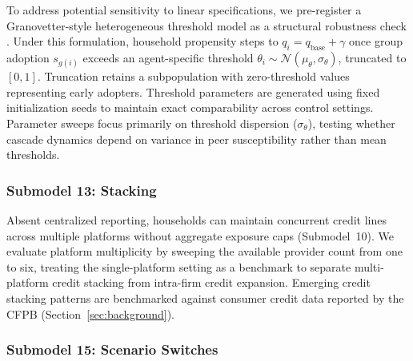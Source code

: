 To address potential sensitivity to linear specifications, we pre-register a Granovetter-style heterogeneous threshold model as a structural robustness check \cite{granovetter1978threshold}.
Under this formulation, household propensity steps to $q_i = q_{\text{base}} + \gamma$ once group adoption $s_{g(i)}$ exceeds an agent-specific threshold $\theta_i \sim \mathcal{N}(\mu_\theta, \sigma_\theta)$, truncated to $[0,1]$.
Truncation retains a subpopulation with zero-threshold values representing early adopters.
Threshold parameters are generated using fixed initialization seeds to maintain exact comparability across control settings.
Parameter sweeps focus primarily on threshold dispersion ($\sigma_\theta$), testing whether cascade dynamics depend on variance in peer susceptibility rather than mean thresholds.

\subsubsection*{Submodel 13: Stacking}
\label{sec:stacking}

Absent centralized reporting, households can maintain concurrent credit lines across multiple platforms without aggregate exposure caps (Submodel~10). We evaluate platform multiplicity by sweeping the available provider count from one to six, treating the single-platform setting as a benchmark to separate multi-platform credit stacking from intra-firm credit expansion. Emerging credit stacking patterns are benchmarked against consumer credit data reported by the \ac{CFPB} (Section~\ref{sec:background}).

\subsubsection*{Submodel 15: Scenario Switches}
\label{sec:levers}

